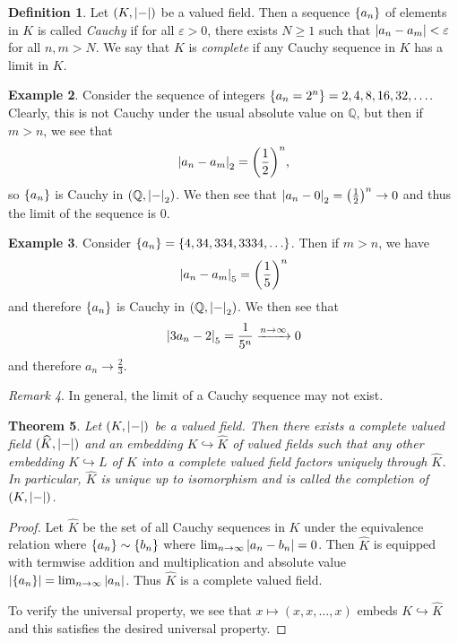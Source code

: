 \documentclass[leqno, openany]{memoir}
\newtheorem{thm}{Theorem}[section]
\theoremstyle{definition}
\newtheorem{defn}[thm]{Definition}
\newtheorem{exm}[thm]{Example}
\theoremstyle{remark}
\newtheorem{rmk}[thm]{Remark}
\theoremstyle{plain}
\theoremstyle{definition}
\theoremstyle{remark}
\newcommand{\Q}{\mathbb{Q}}
\newcommand{\ep}{\varepsilon}
\newcommand{\wh}[1]{\widehat{#1}}
\begin{document}
\begin{defn} Let $(K, \abs{-})$ be a valued field. Then a sequence $\qty{a_n}$
    of elements in $K$ is called \textit{Cauchy} if for all $\ep > 0$, there
    exists $N \geq 1$ such that $\abs{a_n - a_m} < \ep$ for all $n,m > N$. We
    say that $K$ is \textit{complete} if any Cauchy sequence in $K$ has a limit
    in $K$.  \end{defn}

\begin{exm} Consider the sequence of integers $\qty{a_n = 2^n} = 2, 4, 8, 16,
    32, \ldots$. Clearly, this is not Cauchy under the usual absolute value on
    $\Q$, but then if $m > n$, we see that \[ \abs{a_n - a_m}_2 =
    \qty(\frac{1}{2})^n, \] so $\qty{a_n}$ is Cauchy in $(\Q, \abs{-}_2)$. We
then see that $\abs{a_n - 0}_2 = \qty(\frac{1}{2})^n \to 0$ and thus the limit
of the sequence is $0$.  \end{exm}

\begin{exm} Consider $\qty{a_n} = \qty{4, 34, 334, 3334, \ldots}$. Then if $m >
    n$, we have \[ \abs{a_n - a_m}_5 = {\qty(\frac{1}{5})}^n \] and therefore
    $\qty{a_n}$ is Cauchy in $(\Q,\abs{-}_2)$. We then see that \[ \abs{3 a_n -
    2}_5 = \frac{1}{5^n} \xrightarrow{n \to \infty} 0 \] and therefore $a_n \to
\frac{2}{3}$.  \end{exm}

\begin{rmk} In general, the limit of a Cauchy sequence may not exist.
\end{rmk}

\begin{thm} Let $(K, \abs{-})$ be a valued field. Then there exists a complete
    valued field $(\wh{K}, \abs{-})$ and an embedding $K \hookrightarrow
    \wh{K}$ of valued fields such that any other embedding $K \hookrightarrow
    L$ of $K$ into a complete valued field factors uniquely through $\wh{K}$.
    In particular, $\wh{K}$ is unique up to isomorphism and is called the
    \textit{completion} of $(K, \abs{-})$.  \end{thm}

\begin{proof} Let $\wh{K}$ be the set of all Cauchy sequences in $K$ under the
    equivalence relation where $\qty{a_n} \sim \qty{b_n}$ where $\lim_{n \to
    \infty} \abs{a_n - b_n} = 0$. Then $\wh{K}$ is equipped with termwise
    addition and multiplication and absolute value $\abs{\qty{a_n}} = \lim_{n
    \to \infty} \abs{a_n}$. Thus $\wh{K}$ is a complete valued field.

    To verify the universal property, we see that $x \mapsto (x, x, \ldots, x)$
embeds $K \hookrightarrow \wh{K}$ and this satisfies the desired universal
property.  \end{proof}
\end{document}
